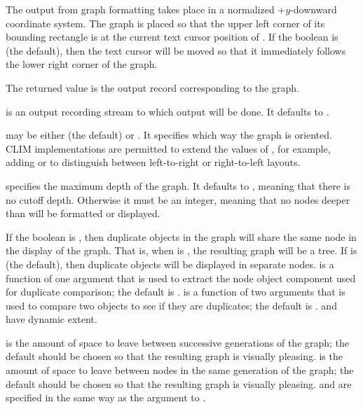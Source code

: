 The output from graph formatting takes place in a normalized +$y$-downward
coordinate system.  The graph is placed so that the upper left corner of its
bounding rectangle is at the current text cursor position of .  If
the boolean  is  (the default), then the text cursor
will be moved so that it immediately follows the lower right corner of the
graph.

The returned value is the output record corresponding to the graph.

 is an output recording stream to which output will be done.  It
defaults to .

 may be either  (the default) or
.  It specifies which way the graph is oriented.  CLIM
implementations are permitted to extend the values of , for
example, adding  or  to distinguish between left-to-right
or right-to-left layouts.

 specifies the maximum depth of the graph.  It defaults to
, meaning that there is no cutoff depth.  Otherwise it must be an
integer, meaning that no nodes deeper than  will be formatted
or displayed.

If the boolean  is , then duplicate objects in
the graph will share the same node in the display of the graph.  That is, when
 is , the resulting graph will be a tree.  If
 is  (the default), then duplicate objects
will be displayed in separate nodes.   is a function of one
argument that is used to extract the node object component used for duplicate
comparison; the default is .   is a function of
two arguments that is used to compare two objects to see if they are duplicates;
the default is .   and  have
dynamic extent.

 is the amount of space to leave between successive
generations of the graph; the default should be chosen so that the resulting
graph is visually pleasing.   is the amount of
space to leave between nodes in the same generation of the graph; the default
should be chosen so that the resulting graph is visually pleasing.
 and  are specified
in the same way as the  argument to
.

